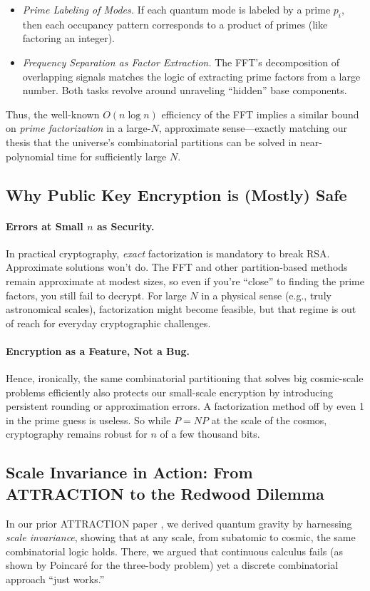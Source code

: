 \documentclass{report}
\begin{document}
\begin{itemize}
\item \emph{Prime Labeling of Modes.} If each quantum mode is labeled by a prime $p_i$, then each occupancy pattern corresponds to a product of primes (like factoring an integer). 
\item \emph{Frequency Separation as Factor Extraction.} The FFT’s decomposition of overlapping signals matches the logic of extracting prime factors from a large number. Both tasks revolve around unraveling “hidden” base components.
\end{itemize}

Thus, the well-known $O(n\log n)$ efficiency of the FFT implies a similar bound on \emph{prime factorization} in a large-$N$, approximate sense—exactly matching our thesis that the universe’s combinatorial partitions can be solved in near-polynomial time for sufficiently large $N$. 

\subsection*{Why Public Key Encryption is (Mostly) Safe}
\label{sec:whyEncryptionSafe}
\paragraph{Errors at Small $n$ as Security.}
In practical cryptography, \emph{exact} factorization is mandatory to break RSA. Approximate solutions won’t do. The FFT and other partition-based methods remain approximate at modest sizes, so even if you’re “close” to finding the prime factors, you still fail to decrypt. For large $N$ in a physical sense (e.g., truly astronomical scales), factorization might become feasible, but that regime is out of reach for everyday cryptographic challenges.

\paragraph{Encryption as a Feature, Not a Bug.}
Hence, ironically, the same combinatorial partitioning that solves big cosmic-scale problems efficiently also protects our small-scale encryption by introducing persistent rounding or approximation errors. A factorization method off by even 1 in the prime guess is useless. So while $P=NP$ at the scale of the cosmos, cryptography remains robust for $n$ of a few thousand bits.

\subsection*{Scale Invariance in Action: From ATTRACTION to the Redwood Dilemma}
In our prior \textsc{ATTRACTION} paper \cite{AbadirAttraction2024}, we derived quantum gravity by harnessing \emph{scale invariance}, showing that at any scale, from subatomic to cosmic, the same combinatorial logic holds. There, we argued that continuous calculus fails (as shown by Poincaré for the three-body problem) yet a discrete combinatorial approach “just works.” 
\end{document}

